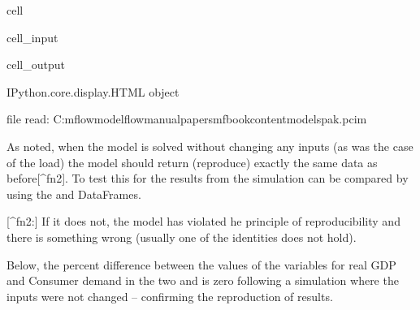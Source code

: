 \documentclass[letterpaper,10pt,english]{jupyterBook}
\begin{document}
\begin{sphinxuseclass}{cell}
\begin{sphinxVerbatimInput}
\begin{sphinxuseclass}{cell_input}
\end{sphinxuseclass}\end{sphinxVerbatimInput}
\begin{sphinxVerbatimOutput}

\begin{sphinxuseclass}{cell_output}
\begin{sphinxVerbatim}[commandchars=\\\{\}]
\PYGZlt{}IPython.core.display.HTML object\PYGZgt{}
\end{sphinxVerbatim}

\begin{sphinxVerbatim}[commandchars=\\\{\}]
file read:  C:\PYGZbs{}mflow\PYGZbs{}modelflow\PYGZhy{}manual\PYGZbs{}papers\PYGZbs{}mfbook\PYGZbs{}content\PYGZbs{}models\PYGZbs{}pak.pcim
\end{sphinxVerbatim}

\end{sphinxuseclass}\end{sphinxVerbatimOutput}

\end{sphinxuseclass}
\sphinxAtStartPar
As noted, when the model is solved without changing any inputs (as was the case of the load) the model should return (reproduce) exactly the same data as before{[}\textasciicircum{}fn2{]}.  To test this for  the results from the simulation can be compared by using the  and  DataFrames.

\sphinxAtStartPar
{[}\textasciicircum{}fn2:{]} If it does not, the model has violated he principle of reproducibility and there is something wrong (usually one of the identities does not hold).

\sphinxAtStartPar
Below, the percent difference between the values of the variables for real GDP and Consumer demand in the two   and  is zero following a simulation where the inputs were not changed – confirming the reproduction of results.
\end{document}
